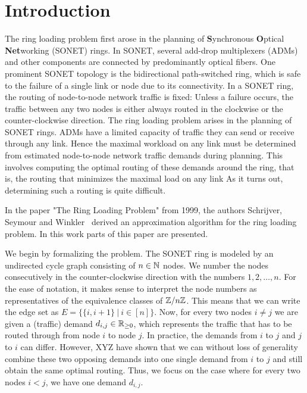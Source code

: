 \section{Introduction}

The ring loading problem first arose in the planning of \textbf{S}ynchronous \textbf{O}ptical \textbf{Net}working (SONET) rings.
In SONET, several add-drop multiplexers (ADMs) and other components are connected by predominantly optical fibers.
One prominent SONET topology is the bidirectional path-switched ring, which is safe to the failure of a single link or node due to its connectivity.
In a SONET ring, the routing of node-to-node network traffic is fixed: Unless a failure occurs, the traffic between any two nodes is either always routed in the clockwise or the counter-clockwise direction.
The ring loading problem arises in the planning of SONET rings.
ADMs have a limited capacity of traffic they can send or receive through any link.
Hence the maximal workload on any link must be determined from estimated node-to-node network traffic demands during planning.
This involves computing the optimal routing of these demands around the ring, that is, the routing that minimizes the maximal load on any link
As it turns out, determining such a routing is quite difficult.

In the paper "The Ring Loading Problem" from 1999, the authors Schrijver, Seymour and Winkler~\cite{schrijver99} derived an approximation algorithm for the ring loading problem.
In this work parts of this paper are presented.

We begin by formalizing the problem.
The SONET ring is modeled by an undirected cycle graph consisting of $n \in \mathbb{N}$ nodes.
We number the nodes consecutively in the counter-clockwise direction with the numbers $1, 2, \dots, n$.
For the ease of notation, it makes sense to interpret the node numbers as representatives of the equivalence classes of $\mathbb{Z}/n\mathbb{Z}$.
This means that we can write the edge set as $E = \{\{i, i+1\}\ |\ i \in [n]\}$.
Now, for every two nodes $i \neq j$ we are given a (traffic) demand $d_{i, j} \in \mathbb{R}_{\geq 0}$, which represents the traffic that has to be routed through from node $i$ to node $j$.
In practice, the demands from $i$ to $j$ and $j$ to $i$ can differ.
However, XYZ have shown that we can without loss of generality combine these two opposing demands into one single demand from $i$ to $j$ and still obtain the same optimal routing.
Thus, we focus on the case where for every two nodes $i < j$, we have one demand $d_{i,j}$.

